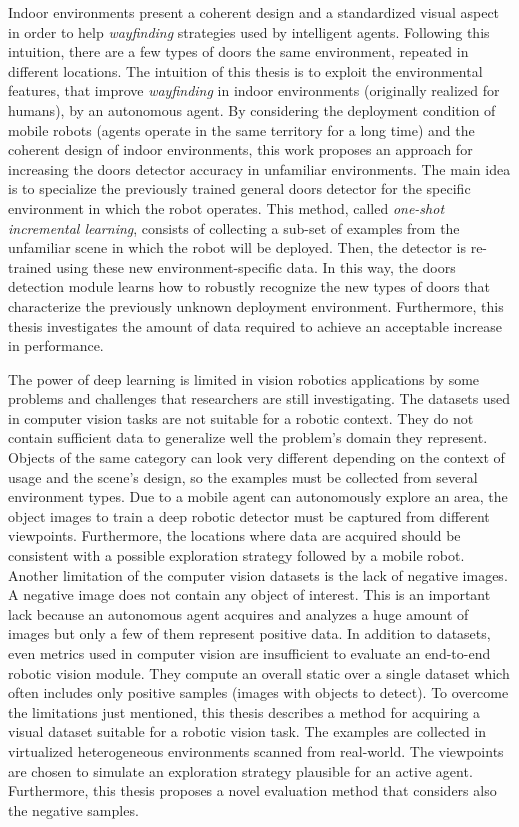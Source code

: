 Indoor environments present a coherent design and a standardized visual aspect in order to help \textit{wayfinding} strategies used by intelligent agents. Following this intuition, there are a few types of doors  the same environment, repeated in different locations. The intuition of this thesis is to exploit the environmental features, that improve \textit{wayfinding} in indoor environments (originally realized for humans), by an autonomous agent. By considering the deployment condition of mobile robots (agents operate in the same territory for a long time) and the coherent design of indoor environments, this work proposes an approach for increasing the doors detector accuracy in unfamiliar environments. The main idea is to specialize the previously trained general doors detector for the specific environment in which the robot operates. This method, called \textit{one-shot incremental learning}, consists of collecting a sub-set of examples from the unfamiliar scene in which the robot will be deployed. Then, the detector is re-trained using these new environment-specific data. In this way, the doors detection module learns how to robustly recognize the new types of doors that characterize the previously unknown deployment environment. Furthermore, this thesis investigates the amount of data required to achieve an acceptable increase in performance.

The power of deep learning is limited in vision robotics applications by some problems and challenges that researchers are still investigating. The datasets used in computer vision tasks are not suitable for a robotic context. They do not contain sufficient data to generalize well the problem's domain they represent. Objects of the same category can look very different depending on the context of usage and the scene's design, so the examples must be collected from several environment types. Due to a mobile agent can autonomously explore an area, the object images to train a deep robotic detector must be captured from different viewpoints. Furthermore, the locations where data are acquired should be consistent with a possible exploration strategy followed by a mobile robot. Another limitation of the computer vision datasets is the lack of negative images. A negative image does not contain any object of interest. This is an important lack because an autonomous agent acquires and analyzes a huge amount of images but only a few of them represent positive data. In addition to datasets, even metrics used in computer vision are insufficient to evaluate an end-to-end robotic vision module. They compute an overall static over a single dataset which often includes only positive samples (images with objects to detect). To overcome the limitations just mentioned, this thesis describes a method for acquiring a visual dataset suitable for a robotic vision task. The examples are collected in virtualized heterogeneous environments scanned from real-world. The viewpoints are chosen to simulate an exploration strategy plausible for an active agent. Furthermore, this thesis proposes a novel evaluation method that considers also the negative samples.

